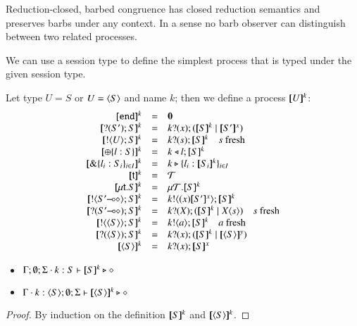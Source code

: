Reduction-closed, barbed congruence has closed reduction semantics and 
preserves barbs under any context. In a sense no barb observer can distinguish
between two related processes.

We can use a session type to define the simplest process that is typed
under the given session type.
\begin{definition}\rm
	Let type $U = S$ or $U = \langle S \rangle$ and name $k$; then we define a process $[\!\![U]\!\!]^{k}$:
	\[
	\begin{array}{rcl}
		\map{\tinact}^{k} &=& \inact \\
		\map{\btinp{S'} S}^{k} &=& \binp{k}{x} (\map{S}^{k} \Par \map{S'}^{x}) \\
		\map{\btout{U} S}^{k} &=& \binp{k}{s} \map{S}^{k} \quad s\textrm{ fresh}\\
		\map{\btsel{l : S}}^{k} &=& \bsel{k}{l} \map{S}^{k} \\
		\map{\btbra{l_i: S_i}_{i \in I}}^{k} &=& \bbra{k}{l_i: \map{S_i}^{k}}_{i \in I}\\
		\map{\tvar{t}}^{k} &=& \rvar{T} \\
		\map{\trec{t}{S}}^{k} &=& \recp{T}{\map{S}^{k}}\\
		\map{\btout{\lhot{S'}} S}^{k} &=& \bout{k}{\abs{x} \map{S'}^x} \map{S}^k\\
		\map{\btinp{\lhot{S'}} S}^{k} &=& \binp{k}{X} (\map{S}^k \Par \appl{X}{s}) \quad s\textrm{ fresh}\\
		\map{\btout{\chtype{S}} S}^{k} &=& \bout{k}{a} \map{S}^k  \quad a\textrm{ fresh}\\
		\map{\btinp{\chtype{S}} S}^{k} &=& \binp{k}{x} (\map{S}^k \Par \map{\chtype{S}}^y)\\
		\map{\chtype{S}}^{k} &=& \binp{k}{x} \map{S}^x
	\end{array}
	\] 
\end{definition}

\begin{proposition}\rm
	\begin{itemize}
		\item	$\Gamma; \emptyset; \Sigma \cdot k:S \vdash [\!\![S]\!\!]^k \triangleright \diamond$
		\item	$\Gamma \cdot k:\langle S \rangle; \emptyset; \Sigma \vdash [\!\![\langle S \rangle]\!\!]^k \triangleright \diamond$
	\end{itemize}
\end{proposition}

\begin{proof}
	By induction on the definition $[\!\![S]\!\!]^k$ and $[\!\![\langle S \rangle]\!\!]^k$.
\end{proof}

